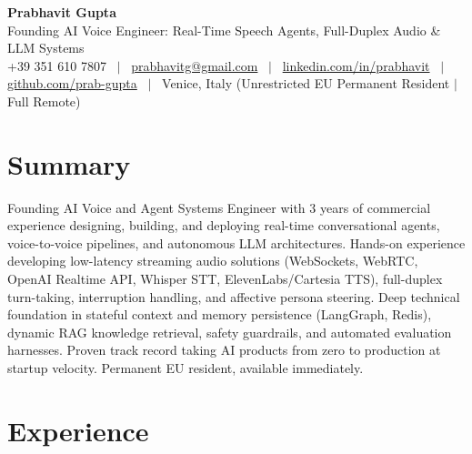 \documentclass[a4paper,10pt]{article}
\begin{document}
\begin{minipage}[c]{0.80\textwidth}
  {\Huge\bfseries Prabhavit Gupta}\\[3pt]
  {\color{accent}\large Founding AI Voice Engineer: Real-Time Speech Agents, Full-Duplex Audio \& LLM Systems}\\[6pt]
  {\footnotesize +39 351 610 7807 ~$\vert$~
  \href{mailto:prabhavitg@gmail.com}{prabhavitg@gmail.com} ~$\vert$~
  \href{https://www.linkedin.com/in/prabhavit/}{linkedin.com/in/prabhavit} ~$\vert$~
  \href{https://github.com/prab-gupta}{github.com/prab-gupta} ~$\vert$~
  Venice, Italy (Unrestricted EU Permanent Resident $\vert$ Full Remote)}
\end{minipage}\hfill

\section{Summary}
Founding AI Voice and Agent Systems Engineer with 3 years of commercial experience designing, building, and deploying real-time conversational agents, voice-to-voice pipelines, and autonomous LLM architectures. Hands-on experience developing low-latency streaming audio solutions (WebSockets, WebRTC, OpenAI Realtime API, Whisper STT, ElevenLabs/Cartesia TTS), full-duplex turn-taking, interruption handling, and affective persona steering. Deep technical foundation in stateful context and memory persistence (LangGraph, Redis), dynamic RAG knowledge retrieval, safety guardrails, and automated evaluation harnesses. Proven track record taking AI products from zero to production at startup velocity. Permanent EU resident, available immediately.

\section{Experience}
\end{document}
